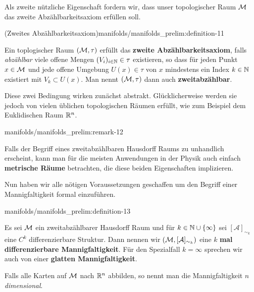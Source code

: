 \par
Als zweite nützliche Eigenschaft fordern wir, dass unser topologischer Raum \(\mathcal{M}\) das zweite Abzählbarkeitsaxiom erfüllen soll.
\begin{definition}{(Zweites Abzählbarkeitsaxiom)}{manifolds/manifolds_prelim:definition-11}



\par
Ein toplogischer Raum \((\mathcal{M}, \tau)\) erfüllt das \textbf{zweite Abzählbarkeitsaxiom}, falls \emph{abzählbar} viele offene Mengen \((V_i)_{i\in\mathbb{N}} \in \tau\) existieren, so dass für jeden Punkt \(x\in \mathcal{M}\) und jede offene Umgebung \(U(x) \in \tau\) von \(x\) mindestens ein Index \(k\in\mathbb{N}\) existiert mit \(V_k \subset U(x)\).
Man nennt \((\mathcal{M}, \tau)\) dann auch \textbf{zweitabzählbar}.
\end{definition}

\par
Diese zwei Bedingung wirken zunächst abstrakt.
Glücklicherweise werden sie jedoch von vielen üblichen topologischen Räumen erfüllt, wie zum Beispiel dem Euklidischen Raum \(\mathbb{R}^n\).
\begin{remark}{}{manifolds/manifolds_prelim:remark-12}



\par
Falls der Begriff eines zweitabzählbaren Hausdorff Raums zu unhandlich erscheint, kann man für die meisten Anwendungen in der Physik auch einfach \textbf{metrische Räume} betrachten, die diese beiden Eigenschaften implizieren.
\end{remark}

\par
Nun haben wir alle nötigen Voraussetzungen geschaffen um den Begriff einer Mannigfaltigkeit formal einzuführen.
\begin{definition}{}{manifolds/manifolds_prelim:definition-13}



\par
Es sei \(\mathcal{M}\) ein zweitabzählbarer Hausdorff Raum und für \(k\in\mathbb{N}\cup \{\infty\}\) sei \([\mathcal{A}]_{\sim_k}\) eine \(C^k\) differenzierbare Struktur.
Dann nennen wir \((\mathcal{M},[\mathcal{A}]_{\sim_k})\) eine \(k\) \textbf{mal differenzierbare Mannigfaltigkeit}.
Für den Spezialfall \(k=\infty\) sprechen wir auch von einer \textbf{glatten Mannigfaltigkeit}.

\par
Falls alle Karten auf \(\mathcal{M}\) nach \(\mathbb{R}^n\) abbilden, so nennt man die Mannigfaltigkeit \emph{\(n\) dimensional}.
\end{definition}

